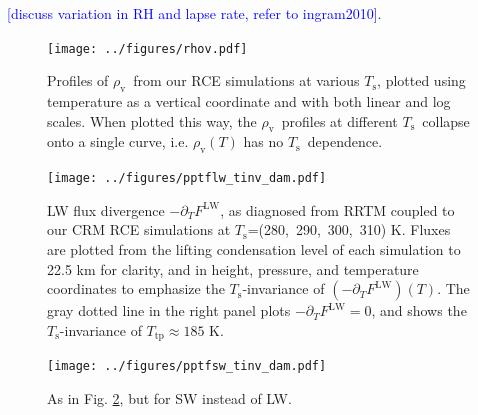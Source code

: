 \documentclass[10pt]{article}
\newcommand{\comment}[1]{\textcolor{blue}{[{#1}]}}
\newcommand{\ppt}{\ensuremath{\partial_T}}
\newcommand{\FLW}{\ensuremath{F^\mathrm{LW}}}
\newcommand{\rhov}{\ensuremath{\rho_\mathrm{v}}}
\newcommand{\Ts}{\ensuremath{T_\mathrm{s}}}
\newcommand{\Ttp}{\ensuremath{T_\mathrm{tp}}}
\begin{document}
\comment{discuss variation in RH and lapse rate, refer to ingram2010}.


\pagebreak

\begin{figure}[h]
	\begin{center}
			\texttt{[image: ../figures/rhov.pdf]}
		\caption{Profiles of \rhov\ from our RCE simulations at various \Ts, plotted using temperature as a vertical coordinate and with both linear and log scales. When plotted this way, the \rhov\ profiles at different \Ts\ collapse onto a single curve, i.e. $\rhov(T)$ has no \Ts\ dependence. 
		\label{rhov_fig}
		}
	\end{center}
\end{figure}



\begin{figure}[h]
	\begin{center}
			\texttt{[image: ../figures/pptflw\_tinv\_dam.pdf]}
		\caption{LW flux divergence  $-\ppt \FLW$, as diagnosed from RRTM coupled to our CRM RCE simulations at \Ts=(280,\ 290,\ 300,\ 310) K. Fluxes are plotted from the lifting condensation level of each simulation to 22.5 km for clarity, and  in height, pressure, and temperature coordinates to emphasize the \Ts-invariance of  $(-\ppt \FLW)(T)$. The gray dotted line in the right panel plots $-\ppt \FLW = 0$, and shows the \Ts-invariance of $\Ttp \approx 185$ K.
		\label{pptflw_tinv_dam}
		}
	\end{center}
\end{figure}

\begin{figure}[h]
	\begin{center}
			\texttt{[image: ../figures/pptfsw\_tinv\_dam.pdf]}
		\caption{As in Fig. \ref{pptflw_tinv_dam}, but for SW instead of LW.
		\label{pptfsw_tinv_dam}
		}
	\end{center}
\end{figure}
\end{document}
